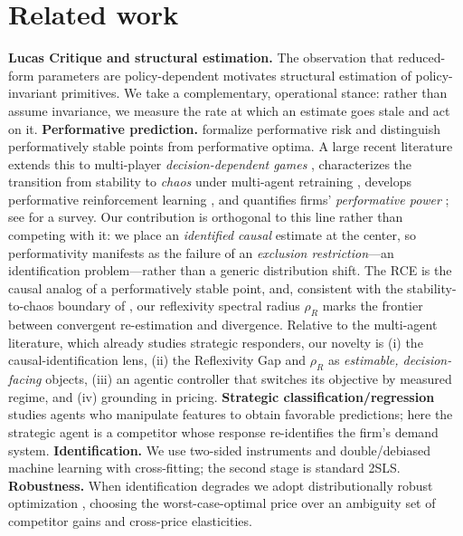 \documentclass[11pt]{article}
\newcommand{\rhoR}{\rho_{R}}
\begin{document}
\section{Related work}
\textbf{Lucas Critique and structural estimation.} The observation that reduced-form parameters
are policy-dependent \cite{lucas1976} motivates structural estimation of policy-invariant
primitives. We take a complementary, operational stance: rather than assume invariance, we
measure the rate at which an estimate goes stale and act on it.
\textbf{Performative prediction.} \cite{perdomo2020} formalize performative risk and distinguish
performatively stable points from performative optima. A large recent literature extends this to
multi-player \emph{decision-dependent games} \cite{narang2023}, characterizes the transition from
stability to \emph{chaos} under multi-agent retraining \cite{piliouras2023}, develops performative
reinforcement learning \cite{mandal2023}, and quantifies firms' \emph{performative power}
\cite{hardt2022}; see \cite{survey2025} for a survey. Our contribution is orthogonal to this line
rather than competing with it: we place an \emph{identified causal} estimate at the center, so
performativity manifests as the failure of an \emph{exclusion restriction}---an identification
problem---rather than a generic distribution shift. The RCE is the causal analog of a
performatively stable point, and, consistent with the stability-to-chaos boundary of
\cite{piliouras2023}, our reflexivity spectral radius $\rhoR$ marks the frontier between
convergent re-estimation and divergence. Relative to the multi-agent literature, which already
studies strategic responders, our novelty is (i) the causal-identification lens, (ii) the
Reflexivity Gap and $\rhoR$ as \emph{estimable, decision-facing} objects, (iii) an agentic
controller that switches its objective by measured regime, and (iv) grounding in pricing.
\textbf{Strategic classification/regression} studies agents who manipulate features to obtain
favorable predictions; here the strategic agent is a competitor whose response re-identifies the
firm's demand system.
\textbf{Identification.} We use two-sided instruments and double/debiased machine learning
\cite{chernozhukov2018} with cross-fitting; the second stage is standard 2SLS.
\textbf{Robustness.} When identification degrades we adopt distributionally robust optimization
\cite{delage2010}, choosing the worst-case-optimal price over an ambiguity set of competitor
gains and cross-price elasticities.
\end{document}

